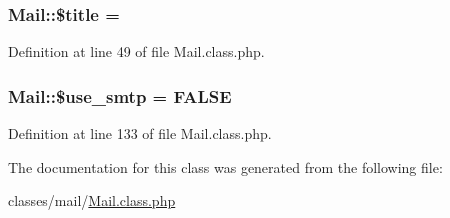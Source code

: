 \hypertarget{classMail_aea1a8697c961d49a688564c5ca16cbcb}{}
\subsubsection[{\$title}]{\setlength{\rightskip}{0pt plus 5cm}Mail\+::\$title = \textquotesingle{}\textquotesingle{}}\label{classMail_aea1a8697c961d49a688564c5ca16cbcb}


Definition at line 49 of file Mail.\+class.\+php.

\hypertarget{classMail_a8fe39b2063dc112d7db67be074142628}{}
\subsubsection[{\$use\+\_\+smtp}]{\setlength{\rightskip}{0pt plus 5cm}Mail\+::\$use\+\_\+smtp = F\+A\+L\+S\+E}\label{classMail_a8fe39b2063dc112d7db67be074142628}


Definition at line 133 of file Mail.\+class.\+php.



The documentation for this class was generated from the following file\+:\begin{DoxyCompactItemize}
\item 
classes/mail/\hyperlink{Mail_8class_8php}{Mail.\+class.\+php}\end{DoxyCompactItemize}
